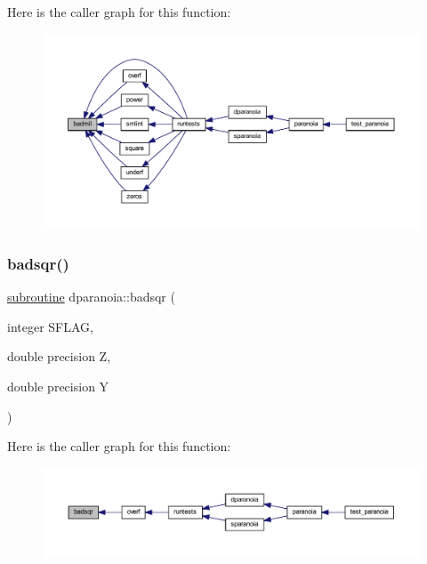 Here is the caller graph for this function\+:
\nopagebreak
\begin{figure}[H]
\begin{center}
\leavevmode
\includegraphics[width=350pt]{dparanoia_8f90_a8bcf697782e3c1e7d445eabced9c10de_icgraph}
\end{center}
\end{figure}
\mbox{\label{dparanoia_8f90_a1eaee4863c898f69a37338f52cc223d2}} 
\subsubsection{\texorpdfstring{badsqr()}{badsqr()}}
{\footnotesize\ttfamily \hyperlink{M__stopwatch_83_8txt_acfbcff50169d691ff02d4a123ed70482}{subroutine} dparanoia\+::badsqr (\begin{DoxyParamCaption}\item[{integer}]{S\+F\+L\+AG,  }\item[{double precision}]{Z,  }\item[{double precision}]{Y }\end{DoxyParamCaption})}

Here is the caller graph for this function\+:
\nopagebreak
\begin{figure}[H]
\begin{center}
\leavevmode
\includegraphics[width=350pt]{dparanoia_8f90_a1eaee4863c898f69a37338f52cc223d2_icgraph}
\end{center}
\end{figure}
\mbox{\label{dparanoia_8f90_a143ab8d599568d2afcca2aa81370b990}} 
